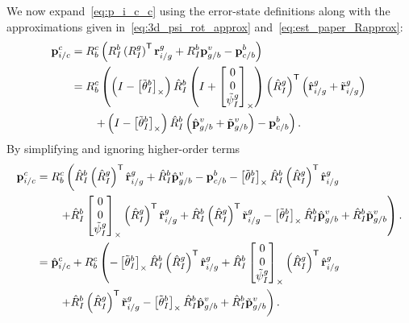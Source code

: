 We now expand~\eqref{eq:p_i_c_c} using the error-state definitions along with
the approximations given in~\eqref{eq:3d_psi_rot_approx}
and~\eqref{eq:est_paper_Rapprox}:
\begin{align}
  \mathrm{\mathbf{p}}_{i/c}^c &= R_b^c \left( R_I^b \left( R_I^g \right)^{\mathsf{T}}
  \mathrm{\mathbf{r}}_{i/g}^g + R_I^b \mathrm{\mathbf{p}}_{g/b}^v - \mathrm{\mathbf{p}}_{c/b}^b \right) \\
  &= R_b^c \left( \left( I - \left[ \tilde{\mathrm{\mathbf{\theta}}}_I^b
     \right]_{\times} \right) \hat{R}_I^b \left( I +
    \left[  \begin{matrix} 0 \\ 0 \\ \tilde{\psi}_I^g \end{matrix}  \right]_{\times}
  \right) \left( \hat{R}_I^g \right)^{\mathsf{T}}
  \left( \hat{\mathrm{\mathbf{r}}}_{i/g}^g + \tilde{\mathrm{\mathbf{r}}}_{i/g}^g \right) \right. \\
  & \qquad \left. + \left( I -
  \left[ \tilde{\mathrm{\mathbf{\theta}}}_I^b \right]_{\times} \right) \hat{R}_I^b
  \left( \hat{\mathrm{\mathbf{p}}}_{g/b}^v + \tilde{\mathrm{\mathbf{p}}}_{g/b}^v \right) -
  \mathrm{\mathbf{p}}_{c/b}^b \right). \nonumber \\
\end{align}
By simplifying and ignoring higher-order terms
\begin{align}
  \mathrm{\mathbf{p}}_{i/c}^c 
  &= R_b^c \left( \hat{R}_I^b \left( \hat{R}_I^g \right)^{\mathsf{T}}
  \hat{\mathrm{\mathbf{r}}}_{i/g}^g + \hat{R}_I^b \hat{\mathrm{\mathbf{p}}}_{g/b}^v - \mathrm{\mathbf{p}}_{c/b}^b
  - \left[ \tilde{\mathrm{\mathbf{\theta}}}_I^b \right]_{\times} \hat{R}_I^b \left( \hat{R}_I^g
    \right)^{\mathsf{T}} \hat{\mathrm{\mathbf{r}}}_{i/g}^g \right. \\
  & \qquad \left. + \hat{R}_I^b
    \left[ \begin{matrix} 0 \\ 0 \\ \tilde{\psi}_I^g \end{matrix} \right]_{\times} \left( \hat{R}_I^g
  \right)^{\mathsf{T}} \hat{\mathrm{\mathbf{r}}}_{i/g}^g +
\hat{R}_I^b \left( \hat{R}_I^g
    \right)^{\mathsf{T}} \tilde{\mathrm{\mathbf{r}}}_{i/g}^g
    - \left[ \tilde{\mathrm{\mathbf{\theta}}}_I^b \right]_{\times} \hat{R}_I^b \hat{\mathrm{\mathbf{p}}}_{g/b}^v
    + \hat{R}_I^b \tilde{\mathrm{\mathbf{p}}}_{g/b}^v
   \right). \nonumber \\
    &= \hat{\mathrm{\mathbf{p}}}_{i/c}^c
    + R_b^c \left( 
  - \left[ \tilde{\mathrm{\mathbf{\theta}}}_I^b \right]_{\times} \hat{R}_I^b \left( \hat{R}_I^g
    \right)^{\mathsf{T}} \hat{\mathrm{\mathbf{r}}}_{i/g}^g + \hat{R}_I^b
    \left[ \begin{matrix} 0 \\ 0 \\ \tilde{\psi}_I^g \end{matrix} \right]_{\times} \left( \hat{R}_I^g
  \right)^{\mathsf{T}} \hat{\mathrm{\mathbf{r}}}_{i/g}^g \right. \label{eq:p_i_c_c_simplified} \\
    & \qquad \left. +
\hat{R}_I^b \left( \hat{R}_I^g
    \right)^{\mathsf{T}} \tilde{\mathrm{\mathbf{r}}}_{i/g}^g
                   - \left[ \tilde{\mathrm{\mathbf{\theta}}}_I^b \right]_{\times} \hat{R}_I^b \hat{\mathrm{\mathbf{p}}}_{g/b}^v
    + \hat{R}_I^b \tilde{\mathrm{\mathbf{p}}}_{g/b}^v
   \right) \nonumber. 
\end{align}
